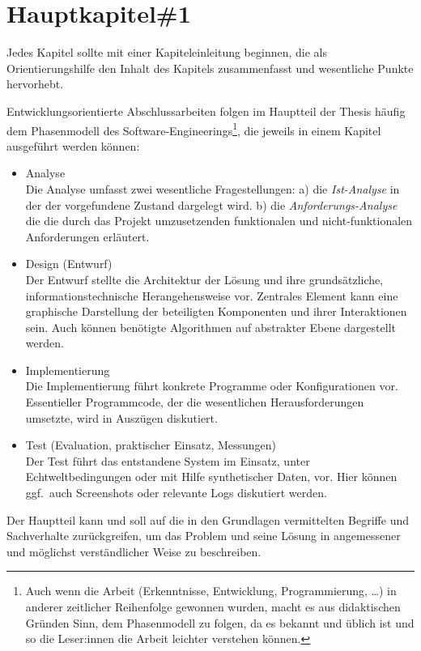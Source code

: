 \chapter{Hauptkapitel\#1}

Jedes Kapitel sollte mit einer Kapiteleinleitung beginnen, die als Orientierungshilfe den Inhalt des Kapitels zusammenfasst und wesentliche Punkte hervorhebt.

Entwicklungsorientierte Abschlussarbeiten folgen im Hauptteil der Thesis häufig dem Phasenmodell des Software-Engineerings\footnote{Auch wenn die Arbeit (Erkenntnisse, Entwicklung, Programmierung, \ldots) in anderer
zeitlicher Reihenfolge gewonnen wurden, macht es aus didaktischen Gründen Sinn, dem Phasenmodell zu folgen, da es bekannt und üblich ist und so die Leser:innen die Arbeit leichter verstehen können.}, die jeweils in einem Kapitel ausgeführt werden können:
\begin{itemize}

\item Analyse\\
Die Analyse umfasst zwei wesentliche Fragestellungen: a) die \emph{Ist-Analyse} in der der vorgefundene Zustand dargelegt wird. b) die \emph{Anforderungs-Analyse} die die durch das Projekt umzusetzenden 
funktionalen und nicht-funktionalen Anforderungen erläutert.

\item Design (Entwurf)\\
Der Entwurf stellte die Architektur der Lösung und ihre grundsätzliche, informationstechnische Herangehensweise vor. 
Zentrales Element kann eine graphische Darstellung der beteiligten Komponenten und ihrer Interaktionen sein. Auch können benötigte Algorithmen auf abstrakter Ebene dargestellt werden.

\item Implementierung\\
Die Implementierung führt konkrete Programme oder Konfigurationen vor. Essentieller Programmcode, der die wesentlichen Herausforderungen umsetzte, wird in Auszügen diskutiert.

\item Test (Evaluation, praktischer Einsatz, Messungen)\\
Der Test führt das entstandene System im Einsatz, unter Echtweltbedingungen oder mit Hilfe synthetischer Daten, vor. Hier können ggf.\ auch Screenshots oder relevante Logs diskutiert werden.
\end{itemize}

Der Hauptteil kann und soll auf die in den Grundlagen vermittelten Begriffe und Sachverhalte zurückgreifen, um das Problem und seine Lösung in angemessener und möglichst verständlicher Weise zu beschreiben.


